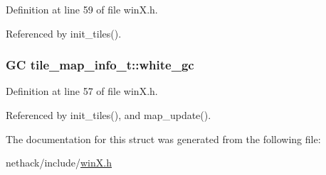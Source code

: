Definition at line 59 of file win\+X.\+h.



Referenced by init\+\_\+tiles().

\hypertarget{structtile__map__info__t_a3ea92989ad6f713bd32bade086be7c64}{
\subsubsection[{white\+\_\+gc}]{\setlength{\rightskip}{0pt plus 5cm}G\+C tile\+\_\+map\+\_\+info\+\_\+t\+::white\+\_\+gc}}\label{structtile__map__info__t_a3ea92989ad6f713bd32bade086be7c64}


Definition at line 57 of file win\+X.\+h.



Referenced by init\+\_\+tiles(), and map\+\_\+update().



The documentation for this struct was generated from the following file\+:\begin{DoxyCompactItemize}
\item 
nethack/include/\hyperlink{winX_8h}{win\+X.\+h}\end{DoxyCompactItemize}
